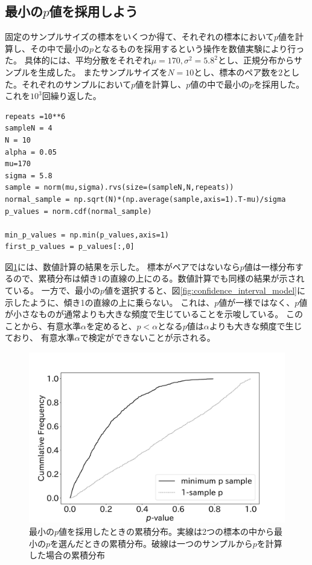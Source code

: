 \subsection{最小の$p$値を採用しよう}
固定のサンプルサイズの標本をいくつか得て、それぞれの標本において$p$値を計算し、その中で最小の$p$となるものを採用するという操作を数値実験により行った。
具体的には、平均分散をそれぞれ$\mu=170,\sigma^2=5.8^2$とし、正規分布からサンプルを生成した。
またサンプルサイズを$N=10$とし、標本のペア数を$2$とした。それぞれのサンプルにおいて$p$値を計算し、$p$値の中で最小の$p$を採用した。
これを$10^3$回繰り返した。

\begin{lstlisting}
repeats =10**6
sampleN = 4
N = 10
alpha = 0.05
mu=170
sigma = 5.8
sample = norm(mu,sigma).rvs(size=(sampleN,N,repeats)) 
normal_sample = np.sqrt(N)*(np.average(sample,axis=1).T-mu)/sigma
p_values = norm.cdf(normal_sample)

min_p_values = np.min(p_values,axis=1)
first_p_values = p_values[:,0]
\end{lstlisting}

図\ref{fig:minimum_p_value_choice}には、数値計算の結果を示した。
標本がペアではないなら$p$値は一様分布するので、累積分布は傾き$1$の直線の上にのる。数値計算でも同様の結果が示されている。
一方で、最小の$p$値を選択すると、図\ref{fig:confidence_interval_model}に示したように、傾き1の直線の上に乗らない。
これは、$p$値が一様ではなく、$p$値が小さなものが通常よりも大きな頻度で生じていることを示唆している。
このことから、有意水準$\alpha$を定めると、$p<\alpha$となる$p$値は$\alpha$よりも大きな頻度で生じており、
有意水準$\alpha$で検定ができないことが示される。

\begin{figure}
  \begin{center}
    \includegraphics[width=15cm]{./image/04_/Minimum-p-values-choice-exmepriment.pdf}
    \caption{最小の$p$値を採用したときの累積分布。実線は2つの標本の中から最小の$p$を選んだときの累積分布。破線は一つのサンプルから$p$を計算した場合の累積分布}
        \label{fig:minimum_p_value_choice}
    \end{center}
\end{figure}

